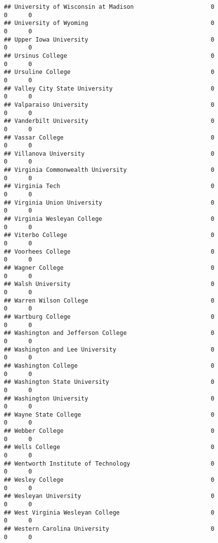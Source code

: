 \documentclass[
]{article}
\begin{document}
\begin{verbatim}
## University of Wisconsin at Madison                      0          0      0
## University of Wyoming                                   0          0      0
## Upper Iowa University                                   0          0      0
## Ursinus College                                         0          0      0
## Ursuline College                                        0          0      0
## Valley City State University                            0          0      0
## Valparaiso University                                   0          0      0
## Vanderbilt University                                   0          0      0
## Vassar College                                          0          0      0
## Villanova University                                    0          0      0
## Virginia Commonwealth University                        0          0      0
## Virginia Tech                                           0          0      0
## Virginia Union University                               0          0      0
## Virginia Wesleyan College                               0          0      0
## Viterbo College                                         0          0      0
## Voorhees College                                        0          0      0
## Wagner College                                          0          0      0
## Walsh University                                        0          0      0
## Warren Wilson College                                   0          0      0
## Wartburg College                                        0          0      0
## Washington and Jefferson College                        0          0      0
## Washington and Lee University                           0          0      0
## Washington College                                      0          0      0
## Washington State University                             0          0      0
## Washington University                                   0          0      0
## Wayne State College                                     0          0      0
## Webber College                                          0          0      0
## Wells College                                           0          0      0
## Wentworth Institute of Technology                       0          0      0
## Wesley College                                          0          0      0
## Wesleyan University                                     0          0      0
## West Virginia Wesleyan College                          0          0      0
## Western Carolina University                             0          0      0

\end{verbatim}
\end{document}
